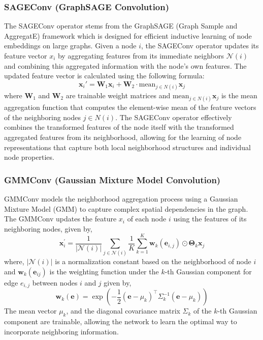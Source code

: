 \subsubsection{SAGEConv (GraphSAGE Convolution)}
The SAGEConv operator stems from the GraphSAGE (Graph Sample and AggregatE) framework which is designed for efficient inductive learning of node embeddings on large graphs. Given a node $i$, the SAGEConv operator updates its feature vector $x_i$ by aggregating features from its immediate neighbors $\mathcal{N}(i)$ and combining this aggregated information with the node's own features. The updated feature vector is calculated using the following formula:
\[
\mathbf{x}_i' = \mathbf{W}_1 \mathbf{x}_i + \mathbf{W}_2 \cdot \text{mean}_{j \in N(i)} \mathbf{x}_j
\]
where  $\mathbf{W}_1$ and $\mathbf{W}_2$ are trainable weight matrices and $\text{mean}_{j \in N(i)} \mathbf{x}_j$ is the mean aggregation function that computes the element-wise mean of the feature vectors of the neighboring nodes $j \in N(i)$. The SAGEConv operator effectively combines the transformed features of the node itself with the transformed aggregated features from its neighborhood, allowing for the learning of node representations that capture both local neighborhood structures and individual node properties.
\subsubsection{GMMConv (Gaussian Mixture Model Convolution)}
GMMConv models the neighborhood aggregation process using a Gaussian Mixture Model (GMM) to capture complex spatial dependencies in the graph. The GMMConv updates the feature \( x_i \) of each node \( i \) using the features of its neighboring nodes, given by, 
\[
\mathbf{x}_i^{\prime}=\frac{1}{|\mathcal{N}(i)|} \sum_{j \in \mathcal{N}(i)} \frac{1}{K} \sum_{k=1}^K \mathbf{w}_k\left(\mathbf{e}_{i, j}\right) \odot \boldsymbol{\Theta}_k \mathbf{x}_j\]
   where, $|\mathcal{N}(i)|$ is a normalization constant based on the neighborhood of node $i$ and \( \mathbf{w}_k(\mathbf{e}_{ij})\) is the weighting function under the \( k \)-th Gaussian component for edge \( e_{i,j} \) between nodes \( i \) and \( j \) given by,
   \[
   \mathbf{w}_k(\mathbf{e})=\exp \left(-\frac{1}{2}\left(\mathbf{e}-\mu_k\right)^{\top} \Sigma_k^{-1}\left(\mathbf{e}-\mu_k\right)\right)
   \]
The mean vector \( \mu_k \), and the diagonal covariance matrix \( \Sigma_k \) of the \( k \)-th Gaussian component are trainable, allowing the network to learn the optimal way to incorporate neighboring information.\\

